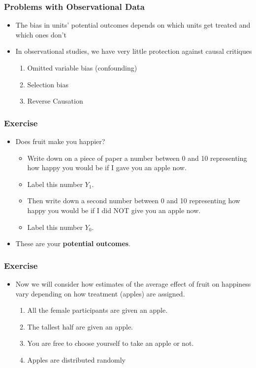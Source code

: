 \documentclass[xcolor=x11names,compress]{beamer}\usepackage[]{graphicx}\usepackage[]{color}
\renewcommand{\(}{\begin{columns}}
\renewcommand{\)}{\end{columns}}
\newcommand{\<}[1]{\begin{column}{#1}}
\renewcommand{\>}{\end{column}}
\begin{document}
\begin{frame}
\frametitle{Problems with Observational Data}
\begin{itemize}
\item The bias in units' potential outcomes depends on which units get treated and which ones don't
\pause
\item In observational studies, we have very little protection against causal critiques
\pause
\begin{enumerate}
\item Omitted variable bias (confounding)
\item Selection bias
\item Reverse Causation
\end{enumerate}
\end{itemize}
\end{frame}

\begin{frame}
\frametitle{Exercise}
\begin{itemize}
\item Does fruit make you happier? 
\pause
\begin{itemize}
\item Write down on a piece of paper a number between 0 and 10 representing how happy you would be if I gave you an apple now. 
\pause
\item Label this number $Y_1$.
\pause
\item Then write down a second number between 0 and 10 representing how happy you would be if I did NOT give you an apple now. 
\pause
\item Label this number $Y_0$.
\pause
\end{itemize}
\item These are your \textbf{potential outcomes}.
\end{itemize}
\end{frame}

\begin{frame}
\frametitle{Exercise}
\begin{itemize}
\item Now we will consider how estimates of the average effect of fruit on happiness vary depending on how treatment (apples) are assigned.
\pause
\begin{enumerate}
\item All the female participants are given an apple.
\pause
\item The tallest half are given an apple.
\pause
\item You are free to choose yourself to take an apple or not.
\pause
\item Apples are distributed randomly
\end{enumerate}
\end{itemize}
\end{frame}
\end{document}
